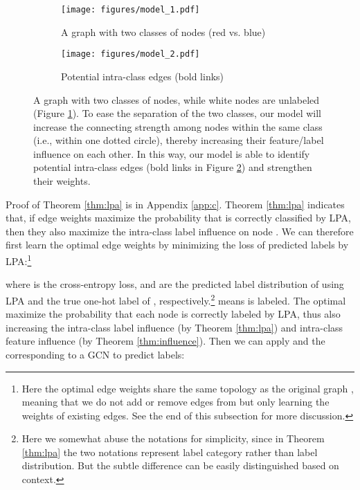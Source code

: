 \documentclass{article}
\begin{document}
		\begin{figure}
			\centering
			\captionsetup[subfigure]{justification=centering}
			\begin{subfigure}[b]{0.22\textwidth}
   				\texttt{[image: figures/model\_1.pdf]}
   				\caption{A graph with two classes of nodes (red vs. blue)}
   				\label{fig:model_1}
			\end{subfigure}
			\hfill
			\begin{subfigure}[b]{0.22\textwidth}
				\texttt{[image: figures/model\_2.pdf]}
				\caption{Potential intra-class edges (bold links)}
				\label{fig:model_2}
			\end{subfigure}
			\caption{A graph with two classes of nodes, while white nodes are unlabeled (Figure \ref{fig:model_1}). To ease the separation of the two classes, our model will increase the connecting strength among nodes within the same class (i.e., within one dotted circle), thereby increasing their feature/label influence on each other. In this way, our model is able to identify potential intra-class edges (bold links in Figure \ref{fig:model_2}) and strengthen their weights.}
			\label{fig:model}
		\end{figure}
		
		Proof of Theorem \ref{thm:lpa} is in Appendix \ref{app:c}.
		Theorem \ref{thm:lpa} indicates that, if edge weights  maximize the probability that  is correctly classified by LPA, then they also maximize the intra-class label influence on node .
		We can therefore first learn the optimal edge weights  by minimizing the loss of predicted labels by LPA:\footnote{Here the optimal edge weights  share the same topology as the original graph , meaning that we do not add or remove edges from  but only learning the weights of existing edges. See the end of this subsection for more discussion.}
		
		where  is the cross-entropy loss,  and  are the predicted label distribution of  using LPA and the true one-hot label of , respectively.\footnote{Here we somewhat abuse the notations for simplicity, since in Theorem \ref{thm:lpa} the two notations represent label category rather than label distribution. But the subtle difference can be easily distinguished based on context.}
		 means  is labeled.
		The optimal  maximize the probability that each node is correctly labeled by LPA, thus also increasing the intra-class label influence (by Theorem \ref{thm:lpa}) and intra-class feature influence (by Theorem \ref{thm:influence}).
		Then we can apply  and the corresponding  to a GCN to predict labels:
		
\end{document}
